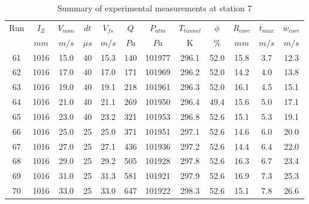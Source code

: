 \begin{table}[H]
\begin{center}
\begin{tabular}{|cccccccccccc|}
	\hline
	Run & $I_Z$ & $V_{nom}$ & $dt$ & $V_{fs}$ & $Q$ & $P_{atm}$ & $T_{tunnel}$ & $\phi$ & $R_{core}$ & $\overline{t}_{max}$ & $\overline{w}_{core}$\\
	  & $mm$ & $m/s$ & $\mu s$ & $m/s$ & $Pa$ & $Pa$ & K & $\%$ & $mm$ & $m/s$ & $m/s$\\
	\hline
	61 & 1016 & 15.0 & 40 & 15.3 & 140 & 101977 & 296.1 & 52.0 & 15.8 & 3.7 & 12.3\\
	62 & 1016 & 17.0 & 40 & 17.0 & 171 & 101969 & 296.2 & 52.0 & 14.2 & 4.0 & 13.8\\
	63 & 1016 & 19.0 & 40 & 19.1 & 218 & 101961 & 296.3 & 52.0 & 16.1 & 4.5 & 15.1\\
	64 & 1016 & 21.0 & 40 & 21.1 & 269 & 101950 & 296.4 & 49.4 & 15.6 & 5.0 & 17.1\\
	65 & 1016 & 23.0 & 40 & 23.2 & 321 & 101953 & 296.8 & 52.6 & 15.1 & 5.3 & 19.1\\
	66 & 1016 & 25.0 & 25 & 25.0 & 371 & 101951 & 297.1 & 52.6 & 14.6 & 6.0 & 20.0\\
	67 & 1016 & 27.0 & 25 & 27.1 & 436 & 101936 & 297.2 & 52.6 & 14.4 & 6.4 & 22.0\\
	68 & 1016 & 29.0 & 25 & 29.2 & 505 & 101928 & 297.8 & 52.6 & 16.3 & 6.7 & 23.4\\
	69 & 1016 & 31.0 & 25 & 31.3 & 581 & 101921 & 297.9 & 52.6 & 16.9 & 7.3 & 25.3\\
	70 & 1016 & 33.0 & 25 & 33.0 & 647 & 101922 & 298.3 & 52.6 & 15.1 & 7.8 & 26.6\\
	\hline
\end{tabular}
\caption{Summary of experimental measurements at station 7}
\label{table:experiment_results_7}
\end{center}
\end{table}
